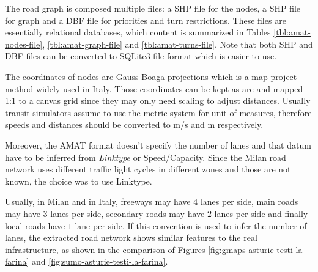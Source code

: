 The road graph is composed multiple files: a SHP file for the nodes, a SHP file for graph and a DBF file for priorities and turn restrictions.
These files are essentially relational databases, which content is summarized in Tables \ref{tbl:amat-nodes-file}, \ref{tbl:amat-graph-file} and \ref{tbl:amat-turns-file}.
Note that both SHP and DBF files can be converted to SQLite3 file format which is easier to use.

The coordinates of nodes are Gauss-Boaga projections which is a map project method widely used in Italy. Those coordinates can be kept as are and mapped 1:1 to a canvas grid since they may only need scaling to adjust distances.
Usually transit simulators assume to use the metric system for unit of measures, therefore speeds and distances should be converted to m/s and m respectively.

Moreover, the AMAT format doesn't specify the number of lanes and that datum have to be inferred from \textit{Linktype} or Speed/Capacity.
Since the Milan road network uses different traffic light cycles in different zones and those are not known, the choice was to use Linktype.

Usually, in Milan and in Italy, freeways may have $4$ lanes per side, main roads may have $3$ lanes per side, secondary roads may have $2$ lanes per side and finally local roads have $1$ lane per side.
If this convention is used to infer the number of lanes, the extracted road network shows similar features to the real infrastructure, as shown in the comparison of Figures \ref{fig:gmaps-asturie-testi-la-farina} and \ref{fig:sumo-asturie-testi-la-farina}.

\begin{table}[H]
  \label{tbl:amat-nodes-file}
\end{table}

